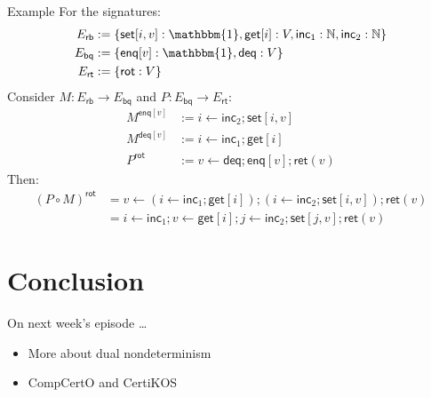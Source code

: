\documentclass{beamer}
\begin{document}
\begin{frame}{Example}
For the signatures:
\begin{align*}
  E_\mathsf{rb} &:= \{ \mathsf{set}[i,v] : \mathbbm{1},
                       \mathsf{get}[i] : V,
                       \mathsf{inc}_1 : \mathbb{N},
                       \mathsf{inc}_2 : \mathbb{N} \} \\
  E_\mathsf{bq} &:= \{ \mathsf{enq}[v] : \mathbbm{1}, \mathsf{deq} : V \} \\
  E_\mathsf{rt} &:= \{ \mathsf{rot} : V \}
\end{align*}
Consider $M : E_\mathsf{rb} \rightarrow E_\mathsf{bq}$
and $P : E_\mathsf{bq} \rightarrow E_\mathsf{rt}$:
\begin{align*}
  M^{\mathsf{enq}[v]} &:=
    i \leftarrow \mathsf{inc}_2 ; \mathsf{set}[i, v] \\
  M^{\mathsf{deq}[v]} &:=
    i \leftarrow \mathsf{inc}_1 ; \mathsf{get}[i] \\
  P^\mathsf{rot} &:= v \leftarrow \mathsf{deq} ;
    \mathsf{enq}[v] ; \mathsf{ret}(v)
\end{align*}
Then:
\begin{align*}
  (P \circ M)^\mathsf{rot} &=
    v \leftarrow (i \leftarrow \mathsf{inc}_1 ; \mathsf{get}[i]);
    (i \leftarrow \mathsf{inc}_2 ; \mathsf{set}[i, v]);
    \mathsf{ret}(v) \\
  &= i \leftarrow \mathsf{inc}_1 ; v \leftarrow \mathsf{get}[i] ;
     j \leftarrow \mathsf{inc}_2 ; \mathsf{set}[j, v] ;
     \mathsf{ret}(v)
\end{align*}
\end{frame}

\section{Conclusion}

\begin{frame}{On next week's episode \ldots}
\begin{itemize}
  \item More about dual nondeterminism
  \item CompCertO and CertiKOS
\end{itemize}
\end{frame}
\end{document}

